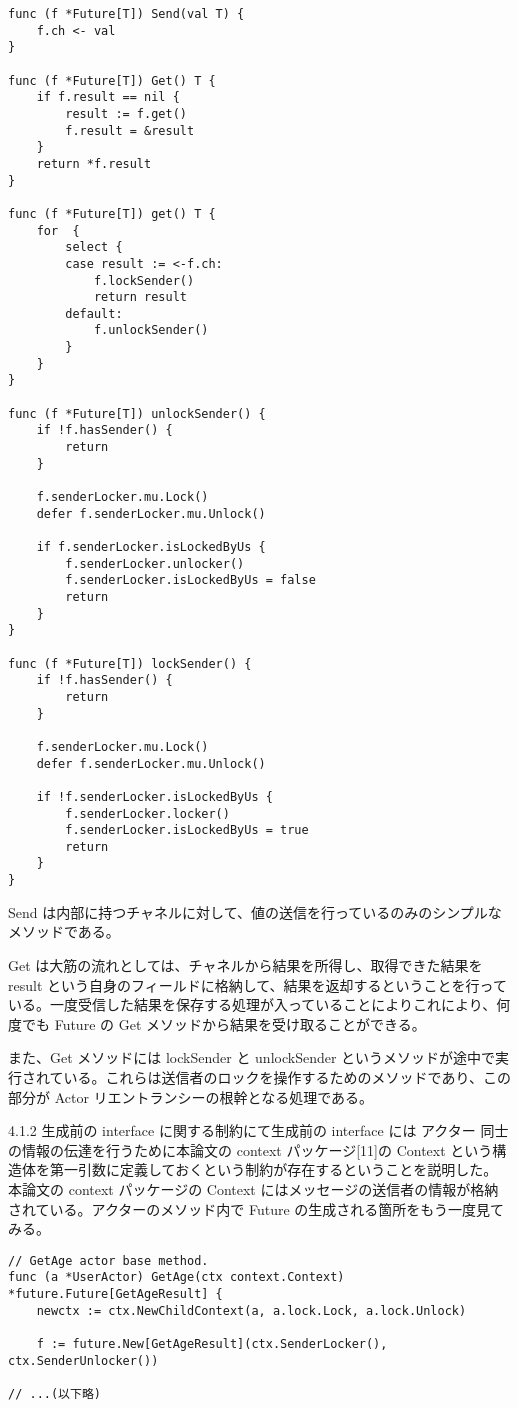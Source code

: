 \begin{verbatim}
func (f *Future[T]) Send(val T) {
    f.ch <- val
}

func (f *Future[T]) Get() T {
    if f.result == nil {
        result := f.get()
        f.result = &result
    }
    return *f.result
}

func (f *Future[T]) get() T {
    for  {
        select {
        case result := <-f.ch:
            f.lockSender()
            return result
        default:
            f.unlockSender()
        }
    }
}

func (f *Future[T]) unlockSender() {
    if !f.hasSender() {
        return
    }

    f.senderLocker.mu.Lock()
    defer f.senderLocker.mu.Unlock()

    if f.senderLocker.isLockedByUs {
        f.senderLocker.unlocker()
        f.senderLocker.isLockedByUs = false
        return
    }
}

func (f *Future[T]) lockSender() {
    if !f.hasSender() {
        return
    }

    f.senderLocker.mu.Lock()
    defer f.senderLocker.mu.Unlock()

    if !f.senderLocker.isLockedByUs {
        f.senderLocker.locker()
        f.senderLocker.isLockedByUs = true
        return
    }
}
\end{verbatim}

Send
は内部に持つチャネルに対して、値の送信を行っているのみのシンプルなメソッドである。

Get は大筋の流れとしては、チャネルから結果を所得し、取得できた結果を
result
という自身のフィールドに格納して、結果を返却するということを行っている。一度受信した結果を保存する処理が入っていることによりこれにより、何度でも
Future の Get メソッドから結果を受け取ることができる。

また、Get メソッドには lockSender と unlockSender
というメソッドが途中で実行されている。これらは送信者のロックを操作するためのメソッドであり、この部分が
Actor リエントランシーの根幹となる処理である。

4.1.2 生成前の interface に関する制約にて生成前の interface には
アクター 同士の情報の伝達を行うために本論文の context
パッケージ{[}11{]}の Context
という構造体を第一引数に定義しておくという制約が存在するということを説明した。
本論文の context パッケージの Context
にはメッセージの送信者の情報が格納されている。アクターのメソッド内で
Future の生成される箇所をもう一度見てみる。

\begin{verbatim}
// GetAge actor base method.
func (a *UserActor) GetAge(ctx context.Context) *future.Future[GetAgeResult] {
    newctx := ctx.NewChildContext(a, a.lock.Lock, a.lock.Unlock)

    f := future.New[GetAgeResult](ctx.SenderLocker(), ctx.SenderUnlocker())

// ...(以下略)
\end{verbatim}

